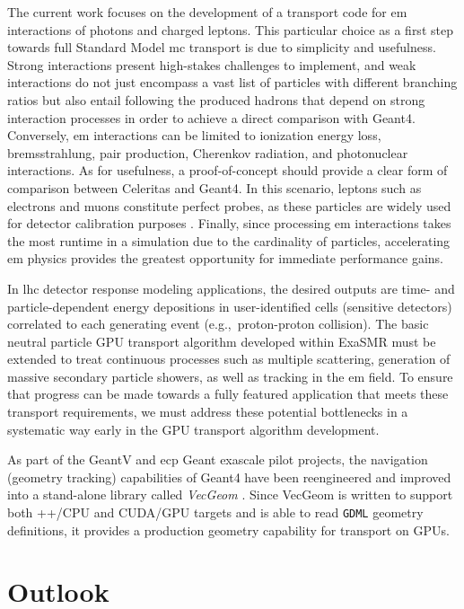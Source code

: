 \documentclass[10pt]{article}
\begin{document}
The current work focuses on the development of a transport code for \ac{em}
interactions of photons and charged leptons. This particular choice as a first
step towards full Standard Model \ac{mc} transport is due to simplicity and
usefulness. Strong interactions present high-stakes challenges to implement, and
weak interactions do not just encompass a vast list of particles with different
branching ratios but also entail following the produced hadrons that depend on
strong interaction processes in order to achieve a direct comparison with
Geant4. Conversely, \ac{em} interactions can be limited to ionization energy
loss, bremsstrahlung, pair production, Cherenkov radiation, and photonuclear
interactions. As for usefulness, a proof-of-concept should provide a clear form
of comparison between Celeritas and Geant4. In this scenario, leptons such as
electrons and muons constitute perfect probes, as these particles are widely
used for detector calibration purposes
\cite{atlas_calibration_e,atlas_calibration_mu}. Finally, since processing
\ac{em} interactions takes the most runtime in a simulation due to the
cardinality of particles, accelerating \ac{em} physics provides the greatest
opportunity for immediate performance gains.

In \ac{lhc} detector response modeling applications, the desired outputs are
time- and particle-dependent energy depositions in user-identified cells
(sensitive detectors) correlated to each generating event (e.g.,~proton-proton
collision). The basic neutral particle GPU transport algorithm developed within
ExaSMR must be extended to treat continuous processes such as multiple
scattering, generation of massive secondary particle showers, as well as
tracking in the \ac{em} field. To ensure that progress can be made
towards a fully featured application that meets these transport requirements, we
must address these potential bottlenecks in a systematic way early in the GPU
transport algorithm development.

As part of the GeantV and \ac{ecp} Geant exascale pilot projects, the navigation
(geometry tracking) capabilities of Geant4 have been reengineered and improved
into a stand-alone library called \emph{VecGeom}
\cite{apostolakis_towards_2015}. Since VecGeom is written to support both
\C++/CPU and CUDA/GPU targets and is able to read \texttt{GDML} geometry
definitions, it provides a production geometry capability for transport on GPUs.

\section*{Outlook}
\end{document}
